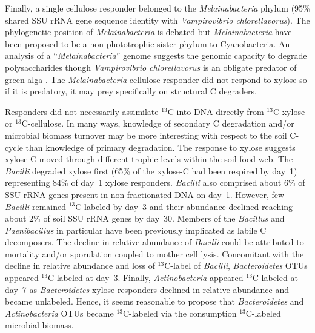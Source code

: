 Finally, a single cellulose responder belonged to the \textit{Melainabacteria}
phylum (95\% shared SSU rRNA gene sequence identity with \textit{Vampirovibrio
chlorellavorus}). The phylogenetic position of \textit{Melainabacteria} is
debated but \textit{Melainabacteria} have been proposed to be
a non-phototrophic sister phylum to Cyanobacteria. An analysis of
a ``\textit{Melainabacteria}'' genome \citep{Di_Rienzi_2013} suggests the
genomic capacity to degrade polysaccharides though \textit{Vampirovibrio
chlorellavorus} is an obligate predator of green alga \citep{gromov_1972}. The
\textit{Melainabacteria} cellulose responder did not respond to xylose so if it
is predatory, it may prey specifically on structural C degraders.

Responders did not necessarily assimilate $^{13}$C into DNA directly
from $^{13}$C-xylose or $^{13}$C-cellulose. In many ways, knowledge of
secondary C degradation and/or microbial biomass turnover may be more
interesting with respect to the soil C-cycle than knowledge of primary
degradation. The response to xylose suggests xylose-C moved through different
trophic levels within the soil food web. The \textit{Bacilli} degraded xylose
first (65\% of the xylose-C had been respired by day~1) representing 84\% of
day~1 xylose responders. \textit{Bacilli} also comprised about 6\% of SSU rRNA
genes present in non-fractionated DNA on day~1. However, few \textit{Bacilli}
remained $^{13}$C-labeled by day~3 and their abundance declined reaching about
2\% of soil SSU rRNA genes by day~30. Members of the \textit{Bacillus}
\citep{Cleveland2007} and \textit{Paenibacillus} in particular
\citep{Verastegui_2014} have been previously implicated as labile
C decomposers. The decline in relative abundance of \textit{Bacilli} could be
attributed to mortality and/or sporulation coupled to mother cell lysis.
Concomitant with the decline in relative abundance and loss of $^{13}$C-label
of \textit{Bacilli}, \textit{Bacteroidetes} OTUs appeared $^{13}$C-labeled at
day~3. Finally, \textit{Actinobacteria} appeared $^{13}$C-labeled at day~7 as
\textit{Bacteroidetes} xylose responders declined in relative abundance and
became unlabeled. Hence, it seems reasonable to propose that
\textit{Bacteroidetes} and \textit{Actinobacteria} OTUs became $^{13}$C-labeled
via the consumption $^{13}$C-labeled microbial biomass. 

